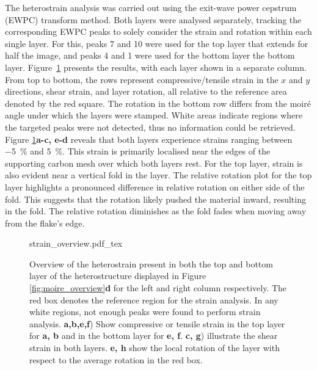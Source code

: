The heterostrain analysis was carried out using the exit-wave power cepstrum (EWPC) transform method. Both layers were analysed separately, tracking the corresponding EWPC peaks to solely consider the strain and rotation within each single layer. For this, peaks 7 and 10 were used for the top layer that extends for half the image, and peaks 4 and 1 were used for the bottom layer the bottom layer. Figure~\ref{fig:strain_overview} presents the results, with each layer shown in a separate column. 
%
From top to bottom, the rows represent compressive/tensile strain in the $x$ and $y$ directions, shear strain, and layer rotation, all relative to the reference area denoted by the red square. 
%
The rotation in the bottom row differs from the moiré angle under which the layers were stamped. White areas indicate regions where the targeted peaks were not detected, thus no information could be retrieved.
%
Figure \ref{fig:strain_overview}\textbf{a-c, e-d} reveals that both layers experience strains ranging between \SI{-5}{\percent} and \SI{5}{\percent}. This strain is primarily localised near the edges of the supporting carbon mesh over which both layers rest. 
%
For the top layer, strain is also evident near a vertical fold in the layer. 
%
The relative rotation plot for the top layer highlights a pronounced difference in relative rotation on either side of the fold.
%
This suggests that the rotation likely pushed the material inward, resulting in the fold. 
%
The relative rotation diminishes as the fold fades when moving away from the flake's edge.

\begin{figure}[p]
    \centering
    \def\svgwidth{.74\linewidth}
    {strain_overview.pdf_tex}
    \caption{Overview of the heterostrain present in both the top and bottom layer of the heterostructure displayed in Figure \ref{fig:moire_overview}\textbf{d} for the left and right column respectively. The red box denotes the reference region for the strain analysis. In any white regions, not enough peaks were found to perform strain analysis. \textbf{a,b,e,f}) Show compressive or tensile strain in the top layer for \textbf{a, b} and in the bottom layer for \textbf{e, f}. \textbf{c, g}) illustrate the shear strain in both layers. \textbf{e, h} show the local rotation of the layer with respect to the average rotation in the red box.}
    \label{fig:strain_overview}
\end{figure}
